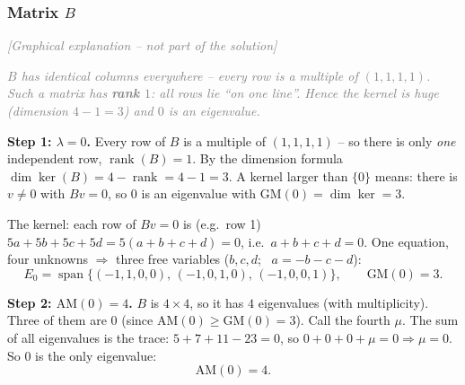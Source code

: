 \documentclass[a4paper,12pt]{article}
\newcommand{\grafik}{\textcolor{gray}{\small\textit{[Graphical explanation -- not part of the solution]}}}
\begin{document}
\subsubsection*{Matrix $B$}

\grafik

\begin{center}
\end{center}

\textcolor{gray}{\small\textit{$B$ has identical columns everywhere -- every row is a multiple of $(1,1,1,1)$. Such a matrix has \textbf{rank $1$}: all rows lie ``on one line''. Hence the kernel is huge (dimension $4 - 1 = 3$) and $0$ is an eigenvalue.}}

\textbf{Step 1: $\lambda = 0$.} Every row of $B$ is a multiple of $(1,1,1,1)$ -- so there is only \emph{one} independent row, $\operatorname{rank}(B) = 1$. By the dimension formula $\dim\ker(B) = 4 - \operatorname{rank} = 4 - 1 = 3$. A kernel larger than $\{0\}$ means: there is $v \neq 0$ with $Bv = 0$, so $0$ is an eigenvalue with $\text{GM}(0) = \dim\ker = 3$.

The kernel: each row of $Bv = 0$ is (e.g.\ row 1) $5a + 5b + 5c + 5d = 5(a+b+c+d) = 0$, i.e.\ $a + b + c + d = 0$. One equation, four unknowns $\Rightarrow$ three free variables ($b, c, d$; \, $a = -b-c-d$):
\[
E_0 = \operatorname{span}\{(-1,1,0,0),\, (-1,0,1,0),\, (-1,0,0,1)\}, \qquad \text{GM}(0) = 3.
\]

\textbf{Step 2: $\text{AM}(0) = 4$.} $B$ is $4\times4$, so it has $4$ eigenvalues (with multiplicity). Three of them are $0$ (since $\text{AM}(0) \ge \text{GM}(0) = 3$). Call the fourth $\mu$. The sum of all eigenvalues is the trace: $5 + 7 + 11 - 23 = 0$, so $0 + 0 + 0 + \mu = 0 \Rightarrow \mu = 0$. So $0$ is the only eigenvalue:
\[
\text{AM}(0) = 4.
\]
\end{document}
